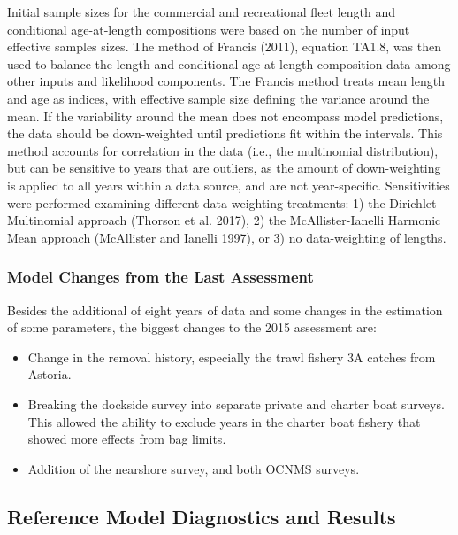 \documentclass[11pt,
  english,
  letterpaper,
]{article}
\providecommand{\tightlist}{%
  \setlength{\itemsep}{0pt}\setlength{\parskip}{0pt}}
\providecommand{\tightlist}{%
  \setlength{\itemsep}{0pt}\setlength{\parskip}{0pt}}
\begin{document}
Initial sample sizes for the commercial and recreational fleet length and conditional age-at-length compositions were based on the number of input effective samples sizes. The method of Francis (2011), equation TA1.8, was then used to balance the length and conditional age-at-length composition data among other inputs and likelihood components. The Francis method treats mean length and age as indices, with effective sample size defining the variance around the mean. If the variability around the mean does not encompass model predictions, the data should be down-weighted until predictions fit within the intervals. This method accounts for correlation in the data (i.e., the multinomial distribution), but can be sensitive to years that are outliers, as the amount of down-weighting is applied to all years within a data source, and are not year-specific. Sensitivities were performed examining different data-weighting treatments: 1) the Dirichlet-Multinomial approach (Thorson et al. 2017), 2) the McAllister-Ianelli Harmonic Mean approach (McAllister and Ianelli 1997), or 3) no data-weighting of lengths.

\hypertarget{model-changes-from-the-last-assessment}{%
\subsubsection{Model Changes from the Last Assessment}\label{model-changes-from-the-last-assessment}}

Besides the additional of eight years of data and some changes in the estimation of some parameters, the biggest changes to the 2015 assessment are:

\begin{itemize}
\tightlist
\item
  Change in the removal history, especially the trawl fishery 3A catches from Astoria.
\item
  Breaking the dockside survey into separate private and charter boat surveys. This allowed the ability to exclude years in the charter boat fishery that showed more effects from bag limits.
\item
  Addition of the nearshore survey, and both OCNMS surveys.
\end{itemize}

\hypertarget{reference-model-diagnostics-and-results}{%
\subsection{Reference Model Diagnostics and Results}\label{reference-model-diagnostics-and-results}}
\end{document}
